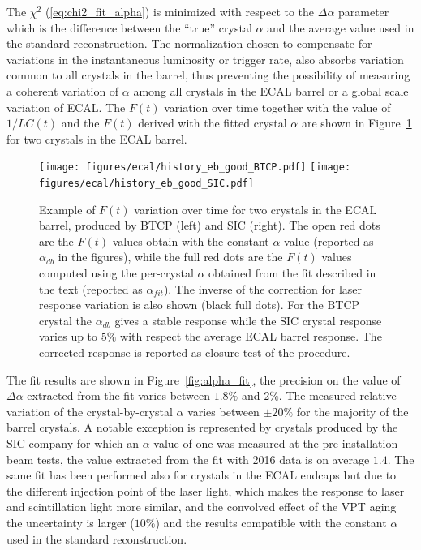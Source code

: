 The $\chi^2$ (\ref{eq:chi2_fit_alpha}) is minimized with respect to the $\Delta\alpha$ parameter which is the difference
between the ``true'' crystal $\alpha$ and the average value used in the standard reconstruction. The \sumEtEB normalization
chosen to compensate for variations in the instantaneous luminosity or trigger rate, also absorbs variation common
to all crystals in the barrel, thus preventing the possibility of measuring a coherent variation of $\alpha$ among all crystals
in the ECAL barrel or a global scale variation of ECAL. The $F(t)$ variation over time together with the value of $1/LC(t)$
and the $F(t)$ derived with the fitted crystal $\alpha$ are shown in Figure~\ref{fig:eflow_examples} for two crystals
in the ECAL barrel.

\begin{figure}[h!]
  \centering
  \texttt{[image: figures/ecal/history\_eb\_good\_BTCP.pdf]}
  \texttt{[image: figures/ecal/history\_eb\_good\_SIC.pdf]}
  \caption{Example of $F(t)$ variation over time for two crystals in the ECAL barrel, produced by BTCP (left) and SIC (right).
    The open red dots are the $F(t)$ values obtain with the constant $\alpha$ value (reported as $\alpha_{db}$ in the figures),
    while the full red dots are the $F(t)$ values computed using the per-crystal $\alpha$ obtained from the fit described in the
    text (reported as $\alpha_{fit}$). The inverse of the correction for laser response variation is also shown (black full dots).
    For the BTCP crystal the $\alpha_{db}$ gives a stable response while the SIC crystal response varies up to $5\%$
    with respect the average ECAL barrel response. The corrected response is reported as closure test of the procedure.}
  \label{fig:eflow_examples}
\end{figure}


The fit results are shown in Figure~\ref{fig:alpha_fit}, the precision on the value of $\Delta\alpha$ extracted from the fit
varies between $1.8\%$ and $2\%$. The measured relative variation of the crystal-by-crystal $\alpha$ varies between
$\pm 20\%$ for the majority of the barrel crystals. A notable exception is represented by crystals produced by the SIC company
for which an  $\alpha$ value of one was measured at the pre-installation beam tests, the value extracted from the fit
with 2016 data is on average $1.4$. The same fit has been performed also for crystals in the ECAL endcaps but due to the
different injection point of the laser light, which makes the response to laser and scintillation light more similar, and
the convolved effect of the VPT aging the uncertainty is larger ($10\%$) and the results compatible with the constant $\alpha$
used in the standard reconstruction.

